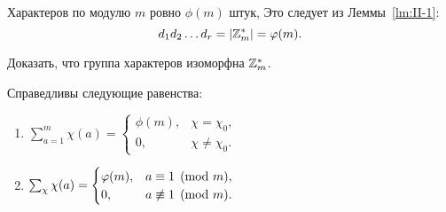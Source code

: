 \begin{remark}
    Характеров по модулю $m$ ровно $\phi(m)$ штук, Это следует из Леммы~\ref{lm:II-1}: 
    \[
        d_1 d_2 \dots d_r = \left| \mathbb{Z}_{m}^{\ast} \right| = \varphi(m).
    \]
\end{remark}

\begin{problem}
    Доказать, что группа характеров изоморфна $\mathbb{Z}_{m}^{\ast}$.
\end{problem}

\begin{nlemma}
\label{lm:II-3}
    Справедливы следующие равенства:
    \begin{enumerate}
        \item
            $\sum_{a=1}^m \chi(a) =
                \begin{cases}
                    \phi(m), & \chi = \chi_0, \\
                    0, & \chi \ne \chi_0.
                \end{cases}$
        \item
            $\sum_\chi \chi(a) =
                \begin{cases}
                    \varphi(m), & a \equiv 1 \pmod m, \\
                    0, & a \not\equiv 1 \pmod{m}.
                \end{cases}$
    \end{enumerate}
\end{nlemma}
